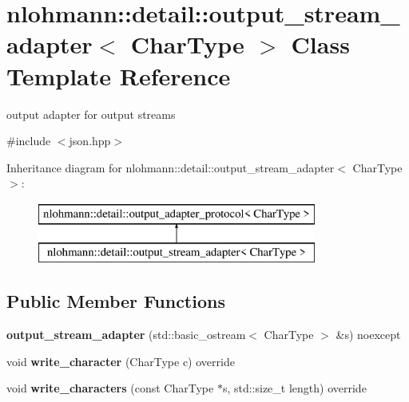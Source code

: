 \hypertarget{classnlohmann_1_1detail_1_1output__stream__adapter}{}\section{nlohmann\+:\+:detail\+:\+:output\+\_\+stream\+\_\+adapter$<$ Char\+Type $>$ Class Template Reference}
\label{classnlohmann_1_1detail_1_1output__stream__adapter}


output adapter for output streams  




{\ttfamily \#include $<$json.\+hpp$>$}

Inheritance diagram for nlohmann\+:\+:detail\+:\+:output\+\_\+stream\+\_\+adapter$<$ Char\+Type $>$\+:\begin{figure}[H]
\begin{center}
\leavevmode
\includegraphics[height=2.000000cm]{classnlohmann_1_1detail_1_1output__stream__adapter}
\end{center}
\end{figure}
\subsection*{Public Member Functions}
\begin{DoxyCompactItemize}
\item 
\mbox{\label{classnlohmann_1_1detail_1_1output__stream__adapter_ae44ed343cb1a716248547f48dd045b6a}} 
{\bfseries output\+\_\+stream\+\_\+adapter} (std\+::basic\+\_\+ostream$<$ Char\+Type $>$ \&s) noexcept
\item 
\mbox{\label{classnlohmann_1_1detail_1_1output__stream__adapter_a6e2698c76b200b2d8fac6cebfc43a245}} 
void {\bfseries write\+\_\+character} (Char\+Type c) override
\item 
\mbox{\label{classnlohmann_1_1detail_1_1output__stream__adapter_ad61375497a7d03cb0bdcddfdaad185d0}} 
void {\bfseries write\+\_\+characters} (const Char\+Type $\ast$s, std\+::size\+\_\+t length) override
\end{DoxyCompactItemize}
